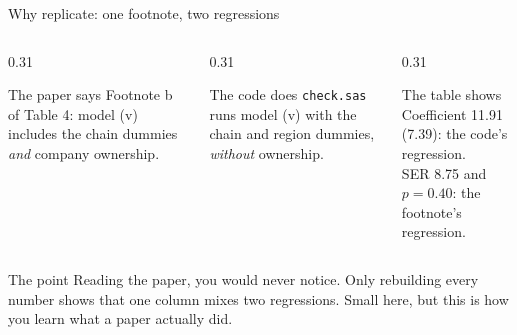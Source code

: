 \documentclass[aspectratio=169,11pt]{beamer}
\begin{document}
\begin{frame}{Why replicate: one footnote, two regressions}
\begin{columns}[T]
\begin{column}{0.31\textwidth}
\begin{block}{The paper says}
\small Footnote b of Table 4: model (v) includes the chain dummies \emph{and} company ownership.
\end{block}
\end{column}
\begin{column}{0.31\textwidth}
\begin{block}{The code does}
\small \texttt{check.sas} runs model (v) with the chain and region dummies, \emph{without} ownership.
\end{block}
\end{column}
\begin{column}{0.31\textwidth}
\begin{block}{The table shows}
\small Coefficient 11.91 (7.39): the code's regression.\\[0.2em]
SER 8.75 and $p=0.40$: the footnote's regression.
\end{block}
\end{column}
\end{columns}
\vspace{1em}
\begin{alertblock}{The point}
Reading the paper, you would never notice. Only rebuilding every number shows that one column mixes two regressions. Small here, but this is how you learn what a paper actually did.
\end{alertblock}
\end{frame}
\end{document}
